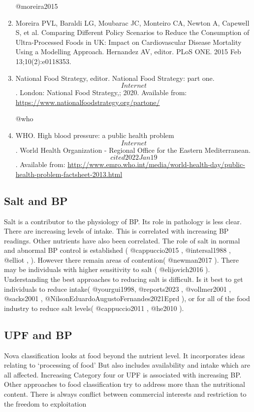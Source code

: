 \documentclass[
]{article}
\begin{document}
\begin{enumerate}
  @moreira2015
\item
  Moreira PVL, Baraldi LG, Moubarac JC, Monteiro CA, Newton A, Capewell
  S, et al. Comparing Different Policy Scenarios to Reduce the
  Consumption of Ultra-Processed Foods in UK: Impact on Cardiovascular
  Disease Mortality Using a Modelling Approach. Hernandez AV, editor.
  PLoS ONE. 2015 Feb 13;10(2):e0118353.
\item
  National Food Strategy, editor. National Food Strategy: part one.
  \[Internet\]. London: National Food Strategy,; 2020. Available from:
  \url{https://www.nationalfoodstrategy.org/partone/}

  @who
\item
  WHO. High blood pressure: a public health problem \[Internet\]. World
  Health Organization - Regional Office for the Eastern Mediterranean.
  \[cited 2022 Jan 19\]. Available from:
  \url{http://www.emro.who.int/media/world-health-day/public-health-problem-factsheet-2013.html}
\end{enumerate}

\hypertarget{salt-and-bp}{%
\subsection{Salt and BP}\label{salt-and-bp}}

Salt is a contributor to the physiology of BP. Its role in pathology is
less clear. There are increasing levels of intake. This is correlated
with increasing BP readings. Other nutrients have also been correlated.
The role of salt in normal and abnormal BP control is established (
@cappuccio2015 , @intersal1988 , @elliot , ). However there remain areas
of contention( @newman2017 ). There may be individuals with higher
sensitivity to salt ( @elijovich2016 ). Understanding the best
approaches to reducing salt is difficult. Is it best to get individuals
to reduce intake( @yourgui1998, @reports2023 , @vollmer2001 , @sacks2001
, @NilsonEduardoAugustoFernandes2021Eprd ), or for all of the food
industry to reduce salt levels( @cappuccio2011 , @he2010 ).

\hypertarget{upf-and-bp}{%
\subsection{UPF and BP}\label{upf-and-bp}}

Nova classification looks at food beyond the nutrient level. It
incorporates ideas relating to `processing of food' But also includes
availability and intake which are all affected. Increasing Category four
or UPF is associated with increasing BP. Other approaches to food
classification try to address more than the nutritional content. There
is always conflict between commercial interests and restriction to the
freedom to exploitation
\end{document}
